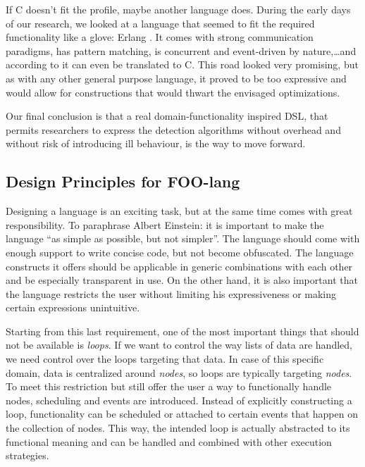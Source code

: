 \documentclass[conference]{IEEEtran}
\begin{document}
If C doesn't fit the profile, maybe another language does. During the early
days of our research, we looked at a language that seemed to fit the required
functionality like a glove: Erlang \cite{armstrong1993concurrent}. It comes
with strong communication paradigms, has pattern matching, is concurrent and
event-driven by nature,\dots and according to \cite{wong1998compiling} it can
even be translated to C. This road looked very promising, but as with any other
general purpose language, it proved to be too expressive and would allow for
constructions that would thwart the envisaged optimizations.

Our final conclusion is that a real domain-functionality inspired DSL, that
permits researchers to express the detection algorithms without overhead and
without risk of introducing ill behaviour, is the way to move forward.

\subsection{Design Principles for FOO-lang}
\label{subsection:design}

Designing a language is an exciting task, but at the same time comes with great
responsibility. To paraphrase Albert Einstein: it is important to make the
language ``as simple as possible, but not simpler''. The language should come
with enough support to write concise code, but not become obfuscated. The
language constructs it offers should be applicable in generic combinations with
each other and be especially transparent in use. On the other hand, it is also
important that the language restricts the user without limiting his
expressiveness or making certain expressions unintuitive.

Starting from this last requirement, one of the most important things that
should not be available is \emph{loops}. If we want to control the way lists of
data are handled, we need control over the loops targeting that data. In case
of this specific domain, data is centralized around \emph{nodes}, so loops are
typically targeting \emph{nodes}. To meet this restriction but still offer the
user a way to functionally handle nodes, scheduling and events are
introduced. Instead of explicitly constructing a loop, functionality can be
scheduled or attached to certain events that happen on the collection of nodes.
This way, the intended loop is actually abstracted to its functional meaning
and can be handled and combined with other execution strategies.
\end{document}
